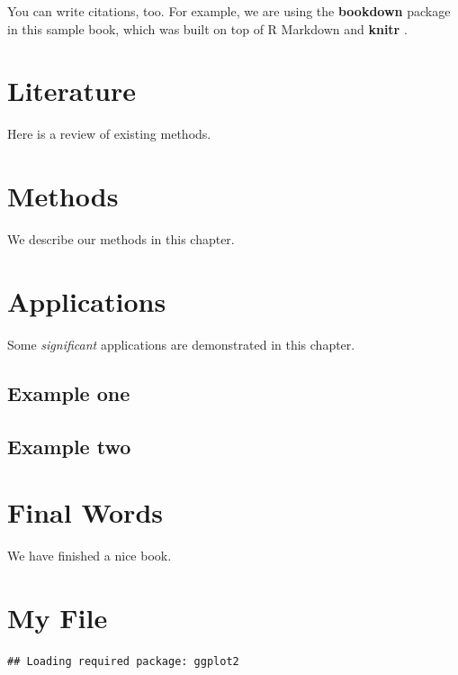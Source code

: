 \documentclass[
]{book}
\begin{document}
You can write citations, too. For example, we are using the \textbf{bookdown} package \citep{R-bookdown} in this sample book, which was built on top of R Markdown and \textbf{knitr} \citep{xie2015}.

\hypertarget{literature}{%
\chapter{Literature}\label{literature}}

Here is a review of existing methods.

\hypertarget{methods}{%
\chapter{Methods}\label{methods}}

We describe our methods in this chapter.

\hypertarget{applications}{%
\chapter{Applications}\label{applications}}

Some \emph{significant} applications are demonstrated in this chapter.

\hypertarget{example-one}{%
\section{Example one}\label{example-one}}

\hypertarget{example-two}{%
\section{Example two}\label{example-two}}

\hypertarget{final-words}{%
\chapter{Final Words}\label{final-words}}

We have finished a nice book.

\hypertarget{my-file}{%
\chapter{My File}\label{my-file}}

\begin{verbatim}
## Loading required package: ggplot2
\end{verbatim}
\end{document}
